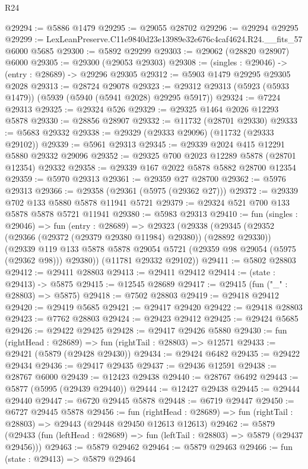 \begin{lexlean}{R24}
\begin{coremodule}
@29294 := @5886 @1479
@29295 := @29055 @28702
@29296 := @29294 @29295
@29299 := LexLeanPreserve.C11e9840d23e13989e32e676c4caf4624.R24.__fits_57 @6000 @5685
@29300 := @5892 @29299
@29303 := @29062 (@28820 @28907) @6000
@29305 := @29300 (@29053 @29303)
@29308 := (singles : @29046) -> (entry : @28689) -> @29296 @29305
@29312 := @5903 @1479 @29295 @29305 @2028
@29313 := @28724 @29078
@29323 := @29312 @29313 (@5923 (@5933 @1479)) (@5939 (@5940 (@5941 @2028) @29295 @5917))
@29324 := @7224 @29313
@29325 := @29324 @526
@29329 := @29325 @1464 @2026 @12293 @5878
@29330 := @28856 @28907
@29332 := @11732 (@28701 @29330)
@29333 := @5683 @29332
@29338 := @29329 (@29333 @29096) (@11732 (@29333 @29102))
@29339 := @5961 @29313
@29345 := @29339 @2024 @415 @12291 @5880 @29332 @29096
@29352 := @29325 @700 @2023 @12289 @5878 (@28701 @12354) @29332
@29358 := @29339 @167 @2022 @5878 @5882 @28700 @12354
@29359 := @5970 @29313
@29361 := @29359 @27 @28700
@29362 := @5976 @29313
@29366 := @29358 (@29361 (@5975 (@29362 @27)))
@29372 := @29339 @702 @133 @5880 @5878 @11941 @5721
@29379 := @29324 @521 @700 @133 @5878 @5878 @5721 @11941
@29380 := @5983 @29313
@29410 := fun (singles : @29046) =>
  fun (entry : @28689) =>
  @29323
    (@29338
      (@29345
        (@29352 (@29366 (@29372 (@29379 @29380 @11984) @29380)) (@28892 @29330))
        (@29339 @119 @133 @5878 @5878 @29054 @5721 (@29359 @98 @29054 (@5975 (@29362 @98))) @29380))
      (@11781 @29332 @29102))
@29411 := @5802 @28803
@29412 := @29411 @28803
@29413 := @29411 @29412
@29414 := (state : @29413) -> @5875
@29415 := @12545 @28689
@29417 := @29415 (fun ("_" : @28803) => @5875)
@29418 := @7502 @28803
@29419 := @29418 @29412
@29420 := @29419 @5685
@29421 := @29417 @29420
@29422 := @29418 @28803
@29423 := @7762 @28803
@29424 := @29423 @29412
@29425 := @29424 @5685
@29426 := @29422 @29425
@29428 := @29417 @29426 @5880
@29430 := fun (rightHead : @28689) => fun (rightTail : @28803) => @12571
@29433 := @29421 (@5879 (@29428 @29430))
@29434 := @29424 @6482
@29435 := @29422 @29434
@29436 := @29417 @29435
@29437 := @29436 @12591
@29438 := @28767 @6000
@29439 := @12423 @29438
@29440 := @28767 @6492
@29443 := @5877 (@5995 (@29439 @29440))
@29444 := @12427 @29438
@29445 := @29444 @29440
@29447 := @6720 @29445 @5878
@29448 := @6719 @29447
@29450 := @6727 @29445 @5878
@29456 := fun (rightHead : @28689) =>
  fun (rightTail : @28803) => @29443 (@29448 @29450 @12613 @12613)
@29462 := @5879
    (@29433 (fun (leftHead : @28689) => fun (leftTail : @28803) => @5879 (@29437 @29456)))
@29463 := @5879 @29462
@29464 := @5879 @29463
@29466 := fun (state : @29413) => @5879 @29464

\end{coremodule}
\end{lexlean}
